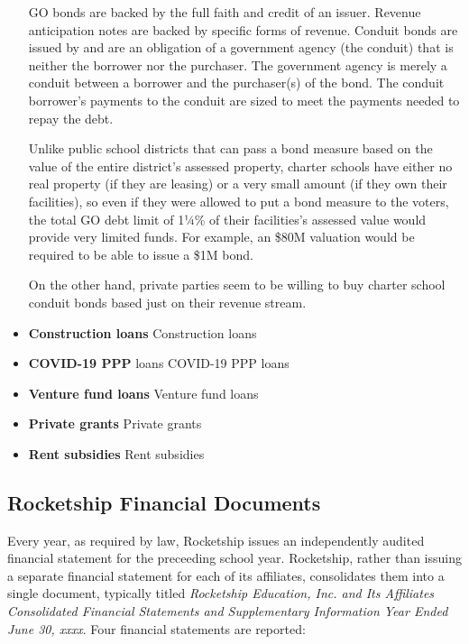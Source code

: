 \begin{itemize}
  GO bonds are backed by the full faith and credit of an issuer.  Revenue anticipation notes are backed by specific forms of revenue. Conduit bonds are issued by and are an obligation of a government agency (the conduit) that is neither the borrower nor the purchaser. The government agency is merely a conduit between a borrower and the purchaser(s) of the bond. The conduit borrower's payments to the conduit are sized to meet the payments needed to repay the debt.

  Unlike public school districts that can pass a bond measure based on the value of the entire district's assessed property, charter schools have either no real property (if they are leasing) or a very small amount (if they own their facilities), so even if they were allowed to put a bond measure to the voters, the total GO debt limit of 1¼\% of their facilities's assessed value would provide very limited funds. For example, an \$80M valuation would be required to be able to issue a \$1M bond.

  On the other hand, private parties seem to be willing to buy charter school conduit bonds based just on their revenue stream.
 
  \item \textbf{Construction loans}  Construction loans\\
  \item \textbf{COVID-19 PPP} loans COVID-19 PPP loans\\
  \item \textbf{Venture fund loans} Venture fund loans\\
  \item \textbf{Private grants} Private grants\\
  \item \textbf{Rent subsidies} Rent subsidies\\
\end{itemize}

\subsection{Rocketship Financial Documents}\label{sec:rocketship-financial-docs}\indent

Every year, as required by law, Rocketship issues an independently audited financial statement for the preceeding school year. Rocketship, rather than issuing a separate financial statement for each of its affiliates, consolidates them into a single document, typically titled \emph{Rocketship Education, Inc. and Its Affiliates Consolidated Financial Statements and Supplementary Information Year Ended June 30, xxxx}. Four financial statements are reported:

